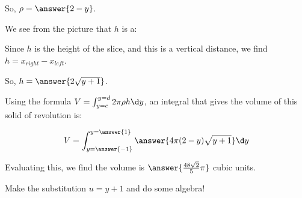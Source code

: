 \documentclass{ximera}
\begin{document}
\begin{exercise}
\begin{exercise}
\begin{exercise}
\begin{exercise}
So, $\rho= \answer{2-y}$.
 \end{exercise}
 
  We see from the picture that $h$ is a:
 \begin{multipleChoice}
 \end{multipleChoice}           
 
 \begin{exercise}
Since $h$ is the height of the slice, and this is a vertical distance, we find $h = x_{right}-x_{left}$.
\begin{multipleChoice}
\end{multipleChoice}       

\begin{multipleChoice}
\end{multipleChoice}   

So, $h= \answer{2\sqrt{y+1}}$.
 \end{exercise}


\begin{exercise}
Using the formula $V = \int_{y=c}^{y=d} 2\pi \rho h \d y$, an integral that gives the volume of this solid of revolution is:

\[
V = \int_{y=\answer{-1}}^{y=\answer{1}} \answer{4 \pi (2-y)\sqrt{y+1}} \d y
\]

Evaluating this, we find the volume is $\answer{ \frac{48 \sqrt{2}}{5} \pi }$ cubic units.

\begin{hint}
Make the substitution $u=y+1$ and do some algebra!
\end{hint}

\end{exercise}    

\end{exercise}



\end{exercise}
\end{exercise}
\end{document}
